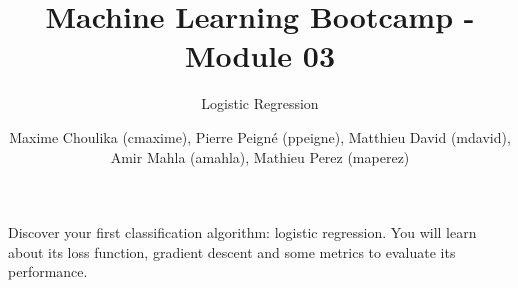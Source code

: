 \documentclass{42-en}
\begin{document}

\title{Machine Learning Bootcamp - Module 03}
\subtitle{Logistic Regression}
\author{
  Maxime Choulika (cmaxime), Pierre Peigné (ppeigne), Matthieu David (mdavid), Amir Mahla (amahla), Mathieu Perez (maperez)
}

\summary
{
  Discover your first classification algorithm: logistic regression.
  You will learn about its loss function, gradient descent and some metrics to evaluate its performance.
}

\maketitle


\newpage
\tableofcontents
\startexercices



\end{document}
